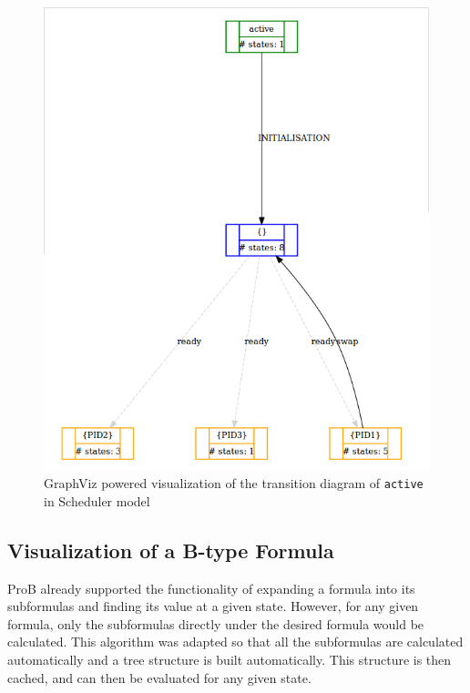 \begin{center}
\begin{figure}[h!]
\centering
\includegraphics[width=14cm]{bilder/transdiag-dotty-wo.png}
\caption{GraphViz powered visualization of the transition diagram of \texttt{active} in Scheduler model}
\label{transdiagDotty}
\end{figure}
\end{center}

\subsection{Visualization of a B-type Formula}

ProB already supported the functionality of expanding a formula into its subformulas and finding its value at a given state. However, for any given formula, only the subformulas directly under the desired formula would be calculated. This algorithm was adapted so that all the subformulas are calculated automatically and a tree structure is built automatically. This structure is then cached, and can then be evaluated for any given state.

